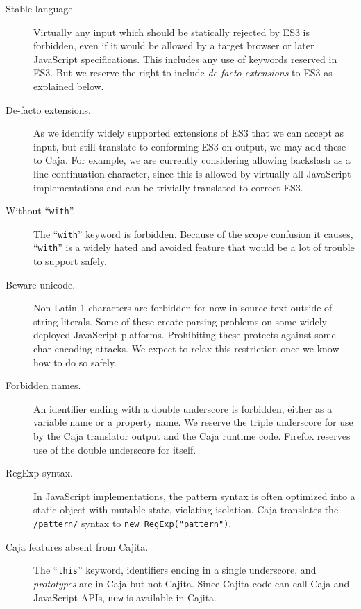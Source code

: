 \documentclass[letterpaper,twocolumn,10pt]{article}
\newcommand{\code}[1]{{\tt {#1}}}              %
\begin{document}
\begin{description}

    \item[Stable language.] Virtually any input which should be statically 
    rejected by ES3 is forbidden, even if it would be allowed by a target 
    browser or later JavaScript specifications. This includes any use of 
    keywords reserved in ES3. But we reserve the right to include 
    \emph{de-facto extensions} to ES3 as explained below.
    
    \item[De-facto extensions.] As we identify widely supported extensions of 
    ES3 that we can accept as input, but still translate to conforming ES3 on 
    output, we may add these to Caja. For example, we are currently 
    considering allowing backslash as a line continuation character, since 
    this is allowed by virtually all JavaScript implementations and can be 
    trivially translated to correct ES3.

    \item[Without ``\code{with}''.] The ``\code{with}'' keyword is forbidden. 
    Because of the scope confusion it causes, ``\code{with}'' is a widely 
    hated and avoided feature that would be a lot of trouble to support 
    safely.

    \item[Beware unicode.] Non-Latin-1 characters are forbidden for now in 
    source text outside of string literals. Some of these create parsing 
    problems on some widely deployed JavaScript platforms. Prohibiting these 
    protects against some char-encoding attacks. We expect to relax this 
    restriction once we know how to do so safely.

    \item[Forbidden names.] An identifier ending with a double underscore is 
    forbidden, either as a variable name or a property name. We reserve the 
    triple underscore for use by the Caja translator output and the Caja 
    runtime code. Firefox reserves use of the double underscore for itself.
    
    \item[RegExp syntax.] In JavaScript implementations, the pattern syntax 
    is often optimized into a static object with mutable state, violating 
    isolation. Caja translates the \code{/pattern/} syntax to \code{new 
    RegExp("pattern")}.
    
    \item[Caja features absent from Cajita.] The ``\code{this}'' keyword, 
    identifiers ending in a single underscore, and \emph{prototypes} are in 
    Caja but not Cajita. Since Cajita code can call Caja and JavaScript APIs, 
    \code{new} is available in Cajita.
    

\end{description}
\end{document}
